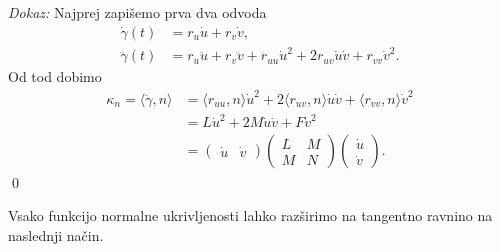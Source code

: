 \noindent
{\em Dokaz:\/}
 Najprej zapišemo prva dva odvoda 
 \begin{align*}
     \dot{\gamma}(t) &= r_u \dot{u} + r_v \dot{v}, \\
     \ddot{\gamma}(t) &=  r_u \ddot{u}+  r_v \ddot{v}+ r_{uu} \dot{u}^2 + 2r_{uv} \dot{u} \dot{v} + r_{vv} \dot{v}^2   .
 \end{align*}
Od tod dobimo 
\begin{align*}
    \kappa_n = \langle \ddot{\gamma}, n \rangle  &= \langle r_{uu}, n \rangle \dot{u}^2 + 2  \langle r_{uv}, n \rangle \dot{u} \dot{v} + \langle r_{vv}, n \rangle  \dot{v}^2 \\
     &= L \dot{u}^2 + 2M \dot{u} \dot{v} + F \dot{v}^2 \\
     &= \begin{pmatrix}
        \dot{u} & \dot{v} 
      \end{pmatrix}
      \begin{pmatrix}
        L & M \\
        M & N
      \end{pmatrix}  
      \begin{pmatrix}
        \dot{u} \\
        \dot{v} 
      \end{pmatrix}.
\end{align*}
\qed

Vsako funkcijo normalne ukrivljenosti lahko razširimo na tangentno ravnino na naslednji način.

